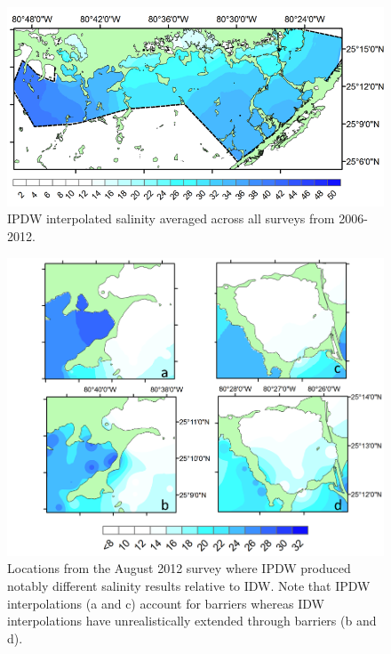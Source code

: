 \documentclass[shortnames,nofooter,noheadings]{jss}
\begin{document}
  \begin{figure}[h]
\begin{center}
\includegraphics{sm-figure2.png}
\end{center}
\vspace{-20pt}
\caption{IPDW interpolated salinity averaged across all surveys from 2006-2012.}
\label{fig:three}
\end{figure}
\FloatBarrier

\begin{figure}[h]
\begin{center}
\includegraphics{sm-figure3.png}
\end{center}
\vspace{-20pt}
\caption{Locations from the August 2012 survey where IPDW produced notably different salinity results relative to IDW. Note that IPDW interpolations (a and c) account for barriers whereas IDW interpolations have unrealistically extended through barriers (b and d).}
\label{fig:four}
\end{figure}
\FloatBarrier
\end{document}
